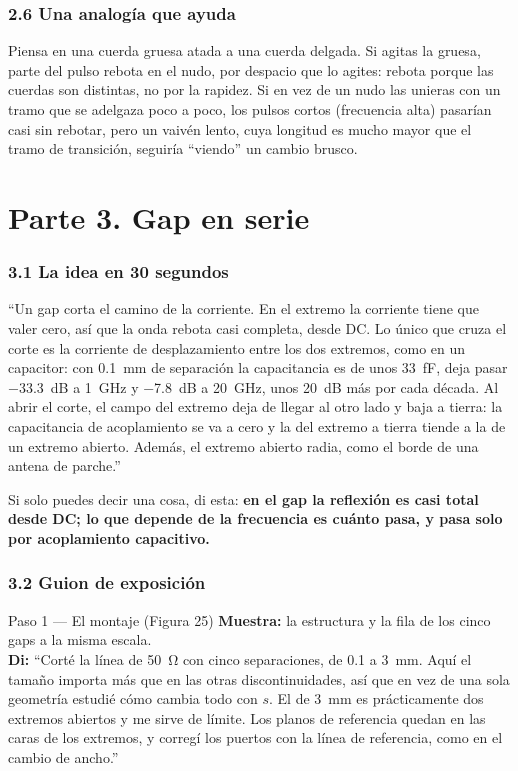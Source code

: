 \documentclass[11pt,letterpaper]{article}
\begin{document}
\section*{2.6 Una analogía que ayuda}
Piensa en una cuerda gruesa atada a una cuerda delgada. Si agitas la gruesa, parte del pulso rebota en el nudo, por despacio que lo agites: rebota porque las cuerdas son distintas, no por la rapidez. Si en vez de un nudo las unieras con un tramo que se adelgaza poco a poco, los pulsos cortos (frecuencia alta) pasarían casi sin rebotar, pero un vaivén lento, cuya longitud es mucho mayor que el tramo de transición, seguiría ``viendo'' un cambio brusco.

\newpage
\part*{Parte 3. Gap en serie}

\section*{3.1 La idea en 30 segundos}
\begin{idea}
``Un gap corta el camino de la corriente. En el extremo la corriente tiene que valer cero, así que la onda rebota casi completa, desde DC. Lo único que cruza el corte es la corriente de desplazamiento entre los dos extremos, como en un capacitor: con \SI{0.1}{mm} de separación la capacitancia es de unos \SI{33}{fF}, deja pasar \SI{-33.3}{dB} a \SI{1}{GHz} y \SI{-7.8}{dB} a \SI{20}{GHz}, unos 20~dB más por cada década. Al abrir el corte, el campo del extremo deja de llegar al otro lado y baja a tierra: la capacitancia de acoplamiento se va a cero y la del extremo a tierra tiende a la de un extremo abierto. Además, el extremo abierto radia, como el borde de una antena de parche.''
\end{idea}

Si solo puedes decir una cosa, di esta: \textbf{en el gap la reflexión es casi total desde DC; lo que depende de la frecuencia es cuánto pasa, y pasa solo por acoplamiento capacitivo.}

\section*{3.2 Guion de exposición}

\begin{paso}{Paso 1 --- El montaje (Figura 25)}
\textbf{Muestra:} la estructura y la fila de los cinco gaps a la misma escala.\\
\textbf{Di:} ``Corté la línea de \SI{50}{\ohm} con cinco separaciones, de \SI{0.1}{} a \SI{3}{mm}. Aquí el tamaño importa más que en las otras discontinuidades, así que en vez de una sola geometría estudié cómo cambia todo con $s$. El de \SI{3}{mm} es prácticamente dos extremos abiertos y me sirve de límite. Los planos de referencia quedan en las caras de los extremos, y corregí los puertos con la línea de referencia, como en el cambio de ancho.''
\end{paso}
\end{document}
